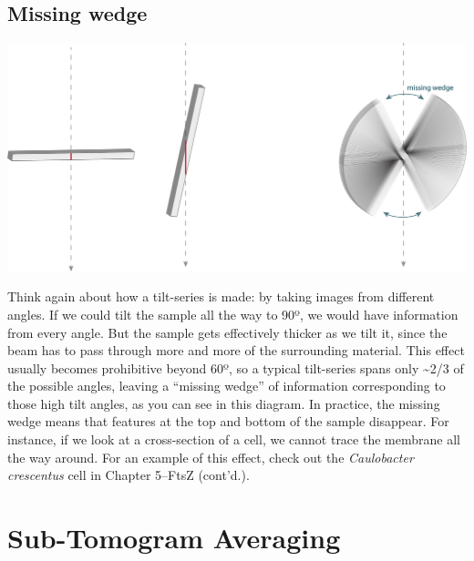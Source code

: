 \documentclass[]{tufte-book}
\begin{document}
\subsection{Missing wedge}\label{Missing_wedge}

\includegraphics{img/schematics/1_6_1}

Think again about how a tilt-series is made: by taking images from
different angles. If we could tilt the sample all the way to 90º, we
would have information from every angle. But the sample gets effectively
thicker as we tilt it, since the beam has to pass through more and more
of the surrounding material. This effect usually becomes prohibitive
beyond 60º, so a typical tilt-series spans only \textasciitilde{}2/3 of
the possible angles, leaving a ``missing wedge'' of information
corresponding to those high tilt angles, as you can see in this diagram.
In practice, the missing wedge means that features at the top and bottom
of the sample disappear. For instance, if we look at a cross-section of
a cell, we cannot trace the membrane all the way around. For an example
of this effect, check out the \emph{Caulobacter crescentus} cell in
Chapter 5--FtsZ (cont'd.).

\section{Sub-Tomogram Averaging}\label{sub-tomogram-averaging}
\end{document}
